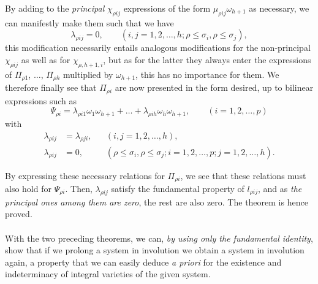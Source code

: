 \documentclass[leqno,11pt]{book}
\theoremstyle{shape1}
\theoremstyle{shapesmall}
\begin{document}
By adding to the \emph{principal} $\chi_{\rho ij}$ expressions of the form $\mu_{\rho ij}\omega_{h+1}$ as necessary, we can manifestly make them such that we have
\[
\lambda_{\rho ij}=0,\qquad(i,j=1,2,\dots,h;\rho\le\sigma_{i},\rho\le\sigma_{j}),
\]
this modification necessarily entails analogous modifications for the non-principal $\chi_{\rho ij}$ as well as for $\chi_{\rho,h+1,i}$, but as for the latter they always enter the expressions of $\Pi_{\rho 1}$, $\dots$, $\Pi_{\rho h}$ multiplied by $\omega_{h+1}$, this has no importance for them. We therefore finally see that $\Pi_{\rho i}$ are now presented in the form desired, up to bilinear expressions such as
\[
\Psi_{\rho i}=\lambda_{\rho i 1}\omega_{1}\omega_{h+1}+\dots+\lambda_{\rho i h}\omega_{h}\omega_{h+1},\qquad(i=1,2,\dots,p)
\]
with
\begin{align*}
  \lambda_{\rho ij}&=\lambda_{\rho ji},&&(i,j=1,2,\dots,h),\\
  \lambda_{\rho ij}&=0,&&(\rho\le \sigma_{i},\rho\le\sigma_{j};i=1,2,\dots,p;j=1,2,\dots,h).
\end{align*}

By expressing these necessary relations for $\Pi_{\rho i}$, we see that these relations must also hold for $\Psi_{\rho i}$. Then, $\lambda_{\rho ij}$ satisfy the fundamental property of $l_{\rho ij}$, and as \emph{the principal ones among them are zero}, the rest are also zero. The theorem is hence proved.

\paragraph{}
\label{sec:p9}
With the two preceding theorems, we can, \emph{by using only the fundamental identity}, show that if we prolong a system in involution we obtain a system in involution again, a property that we can easily deduce \emph{a priori} for the existence and indeterminacy of integral varieties of the given system.
\end{document}

